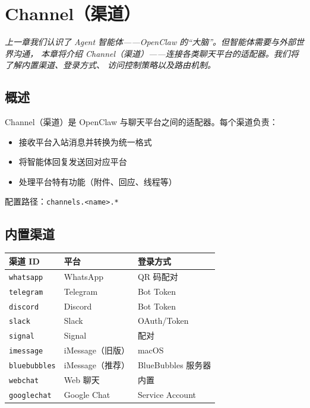 \chapter{Channel（渠道）}

\vspace{0.5em}
\noindent\textit{上一章我们认识了 Agent 智能体——OpenClaw 的“大脑”。但智能体需要与外部世界沟通，
本章将介绍 Channel（渠道）——连接各类聊天平台的适配器。我们将了解内置渠道、登录方式、
访问控制策略以及路由机制。}
\vspace{0.5em}

\section{概述}

Channel（渠道）是 OpenClaw 与聊天平台之间的适配器。每个渠道负责：

\begin{itemize}
  \item 接收平台入站消息并转换为统一格式
  \item 将智能体回复发送回对应平台
  \item 处理平台特有功能（附件、回应、线程等）
\end{itemize}

配置路径：\texttt{channels.<name>.*}

\section{内置渠道}

\begin{center}
\begin{tabular}{lll}
\toprule
\textbf{渠道 ID} & \textbf{平台} & \textbf{登录方式} \\
\midrule
\texttt{whatsapp} & WhatsApp & QR 码配对 \\
\texttt{telegram} & Telegram & Bot Token \\
\texttt{discord} & Discord & Bot Token \\
\texttt{slack} & Slack & OAuth/Token \\
\texttt{signal} & Signal & 配对 \\
\texttt{imessage} & iMessage（旧版） & macOS \\
\texttt{bluebubbles} & iMessage（推荐） & BlueBubbles 服务器 \\
\texttt{webchat} & Web 聊天 & 内置 \\
\texttt{googlechat} & Google Chat & Service Account \\
\bottomrule
\end{tabular}
\end{center}

